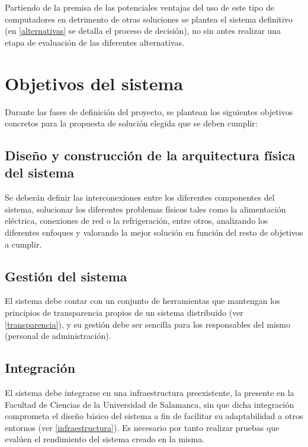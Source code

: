 Partiendo de la premisa de las potenciales ventajas del uso de este tipo de computadores en detrimento de otras soluciones se plantea el sistema definitivo (en \ref{alternativas} se detalla el proceso de decisión), no sin antes realizar una etapa de evaluación de las diferentes alternativas.

\section{Objetivos del sistema}

Durante las fases de definición del proyecto, se plantean los siguientes objetivos concretos para la propuesta de solución elegida que se deben cumplir:

\subsection{Diseño y construcción de la arquitectura física del sistema}

Se deberán definir las interconexiones entre los diferentes componentes del sistema, solucionar los diferentes problemas físicos tales como la alimentación eléctrica, conexiones de red o la refrigeración, entre otros, analizando los diferentes enfoques y valorando la mejor solución en función del resto de objetivos a cumplir.

\subsection{Gestión del sistema}

El sistema debe contar con un conjunto de herramientas que mantengan los principios de transparencia propios de un sistema distribuido (ver \ref{transparencia}), y su gestión debe ser sencilla para los responsables del mismo (personal de administración).

\subsection{Integración}

El sistema debe integrarse en una infraestructura preexistente, la presente en la Facultad de Ciencias de la Universidad de Salamanca, sin que dicha integración comprometa el diseño básico del sistema a fin de facilitar su adaptabilidad a otros entornos (ver \ref{infraestructura}). Es necesario por tanto realizar pruebas que evalúen el rendimiento del sistema creado en la misma. %

